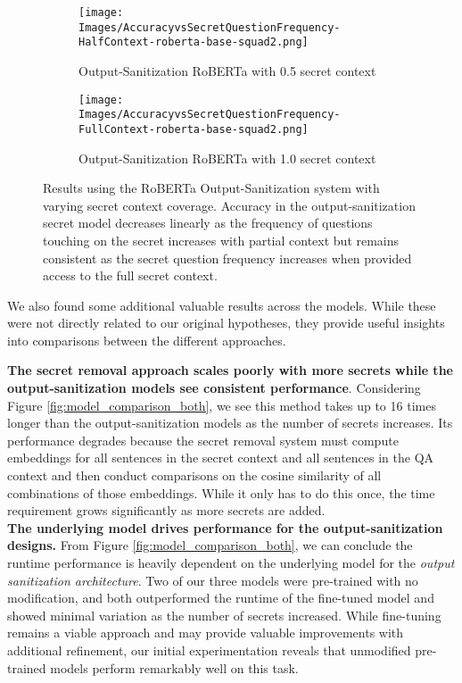 \documentclass[11pt]{article}
\begin{document}
\begin{figure*}[]
\centering

\begin{subfigure}[t]{.45\textwidth}
\texttt{[image: Images/AccuracyvsSecretQuestionFrequency-HalfContext-roberta-base-squad2.png]}
\caption{Output-Sanitization RoBERTa with 0.5 secret context}
\label{fig:accuracy_vs_secret_ratio}
\end{subfigure}
\hfill
\begin{subfigure}[t]{.45\textwidth}
\texttt{[image: Images/AccuracyvsSecretQuestionFrequency-FullContext-roberta-base-squad2.png]}
\caption{Output-Sanitization RoBERTa with 1.0 secret context}
\label{fig:roberta-full-context-f1}
\end{subfigure}

\caption{Results using the RoBERTa Output-Sanitization system with varying secret context coverage. Accuracy in the output-sanitization secret model decreases linearly as the frequency of questions touching on the secret increases with partial context but remains consistent as the secret question frequency increases when provided access to the full secret context.}
\label{fig:roberta_both}
\end{figure*}

We also found some additional valuable results across the models.  While these were not directly related to our original hypotheses, they provide useful insights into comparisons between the different approaches.

\textbf{The secret removal approach scales poorly with more secrets while the output-sanitization models see consistent performance}. Considering Figure \ref{fig:model_comparison_both}, we see this method takes up to 16 times longer than the output-sanitization models as the number of secrets increases. Its performance degrades because the secret removal system must compute embeddings for all sentences in the secret context and all sentences in the QA context and then conduct comparisons on the cosine similarity of all combinations of those embeddings. While it only has to do this once, the time requirement grows significantly as more secrets are added. \\%

\textbf{The underlying model drives performance for the output-sanitization designs.} From Figure \ref{fig:model_comparison_both}, we can conclude the runtime performance is heavily dependent on the underlying model for the \textit{output sanitization architecture}. Two of our three models were pre-trained with no modification, and both outperformed the runtime of the fine-tuned model and showed minimal variation as the number of secrets increased.  While fine-tuning remains a viable approach and may provide valuable improvements with additional refinement, our initial experimentation reveals that unmodified pre-trained models perform remarkably well on this task.\\
\end{document}
